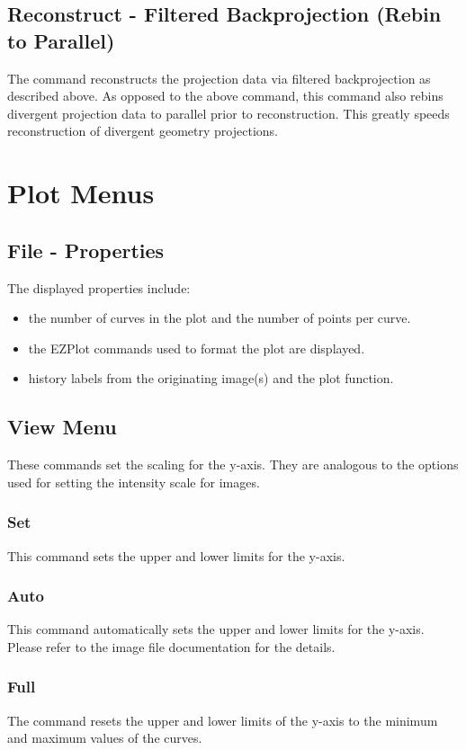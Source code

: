 \subsection{Reconstruct - Filtered Backprojection (Rebin to Parallel)}\label{IDH_DLG_RECONSTRUCTION_REBIN}
The command reconstructs the projection data via filtered backprojection
as described above. As opposed to the above command, this command also
rebins divergent projection data to parallel prior to reconstruction.
This greatly speeds reconstruction of divergent geometry projections.

\section{Plot Menus}
\subsection{File - Properties}
The displayed properties include:

\begin{itemize}\itemsep=0pt
\item the number of curves in the plot and the number of points per curve.
\item the EZPlot commands used to format the plot are displayed.
\item history labels from the originating image(s) and the plot function.
\end{itemize}

\subsection{View Menu}
These commands set the scaling for the y-axis. They are analogous
to the options used for setting the intensity scale for images.

\subsubsection{Set}
This command sets the upper and lower limits for the y-axis.

\subsubsection{Auto}
This command automatically sets the upper and lower limits for the
y-axis. Please refer to the image file 
documentation for the details.

\subsubsection{Full}
The command resets the upper and lower limits of the y-axis to the
minimum and maximum values of the curves.
